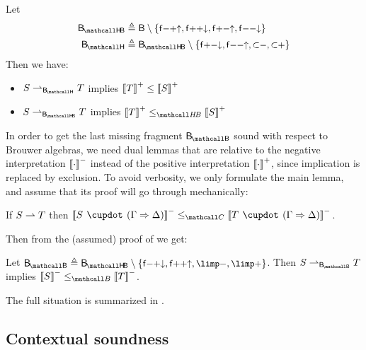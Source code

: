 \begin{corollary}\label{cor:lsoundness}
  Let
  \begin{align*}
    \sysBHB &\defeq \sysB \setminus \{\rsf{f{-}{+}{\uparrow}}, \rsf{f{+}{+}{\downarrow}}, \rsf{f{+}{-}{\uparrow}}, \rsf{f{-}{-}{\downarrow}}\} \\
    \sysBH &\defeq \sysBHB \setminus \{\rsf{f{+}{-}{\downarrow}, \rsf{f{-}{-}{\uparrow}, \rsf{{\lsub}{-}}, \rsf{{\lsub}{+}}}}\}
  \end{align*}
  Then we have:
  \begin{itemize}
    \item $S \lstepsys{\sysBH} T$ implies $\left\llbracket T \right\rrbracket^+ \leq \left\llbracket S \right\rrbracket^+$
    \item $S \lstepsys{\sysBHB} T$ implies $\psint{T} \sementHB \psint{S}$
  \end{itemize}
\end{corollary}

In order to get the last missing fragment $\sysBB$ sound with respect to Brouwer
algebras, we need dual lemmas that are relative to the negative interpretation
$\left\llbracket \cdot \right\rrbracket^-$ instead of the positive interpretation $\left\llbracket \cdot \right\rrbracket^+$, since
implication is replaced by exclusion. To avoid verbosity, we only formulate the
main lemma, and assume that its proof will go through mechanically:

\begin{lemma}
  If $S \rightharpoonup T$ then $\nsint{S \mix (\Gamma \seq \Delta)} \sementC \nsint{T
  \mix (\Gamma \seq \Delta)}$.
\end{lemma}

Then from the (assumed) proof of  we get:
\begin{corollary}\label{cor:lcosoundness}
  Let $\sysBB \defeq \sysBHB \setminus \{\rsf{f{-}{+}{\downarrow}},
  \rsf{f{+}{+}{\uparrow}}, \rsf{{\limp}{-}}, \rsf{{\limp}{+}}\}$. Then $S
  \lstepsys{\sysBB} T$ implies $\nsint{S} \sementB \nsint{T}$.
\end{corollary}

The full situation is summarized in .

\subsection{Contextual soundness}

